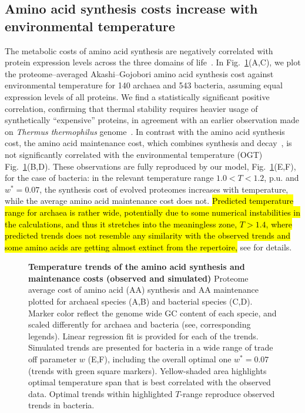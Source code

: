 \documentclass[10pt,letterpaper]{article}
\begin{document}
\subsection*{Amino acid synthesis costs increase with environmental temperature}

The metabolic costs of amino acid synthesis are negatively correlated with protein expression levels across the three domains of life~\cite{Akashi2002Metabolic,Swire2007Selection}. In Fig.~\ref{fig:fig6}(A,C), we plot the proteome--averaged Akashi--Gojobori amino acid synthesis cost against environmental temperature for 140 archaea and 543 bacteria, assuming equal expression levels of all proteins. We find a statistically significant positive correlation, confirming that thermal stability requires heavier usage of synthetically ``expensive'' proteins, in agreement with an earlier observation made on {\it Thermus thermophilus} genome~\cite{Swire2007Selection}. In contrast with the amino acid synthesis cost, the amino acid maintenance cost, which combines synthesis and decay~\cite{Krick2014Amino}, is not significantly correlated with the environmental temperature (OGT) Fig.~\ref{fig:fig6}(B,D). These observations are fully reproduced by our model, Fig.~\ref{fig:fig6}(E,F), for the case of bacteria: in the relevant temperature range $1.0 < T < 1.2$, p.u. and $w^*=0.07$,  the synthesis cost of evolved proteomes increases with temperature, while the average amino acid maintenance cost does not.
\hl{Predicted temperature range for archaea is rather wide, potentially due to some numerical instabilities in the calculations, and thus it stretches into the meaningless zone, $T > 1.4$, where predicted trends does not resemble any similarity with the observed trends and some amino acids are getting almost extinct from the repertoire,} see  for details.



\begin{figure}[h!]
\caption{
{\bf Temperature trends of the amino acid synthesis and maintenance costs (observed and simulated)}
Proteome average cost of amino acid (AA) synthesis and AA maintenance plotted for archaeal species (A,B) and bacterial species (C,D). Marker color reflect the genome wide GC content of each specie, and scaled differently for archaea and bacteria (see, corresponding legends). Linear regression fit is provided for each of the trends.
Simulated trends are presented for bacteria in a wide range of trade off parameter $w$ (E,F), including the overall optimal one $w^*=0.07$ (trends with green square markers). Yellow-shaded area highlights optimal temperature span that is best correlated with the observed data. Optimal trends within highlighted $T$-range reproduce observed trends in bacteria.
}
\label{fig:fig6}
\end{figure}
\end{document}
